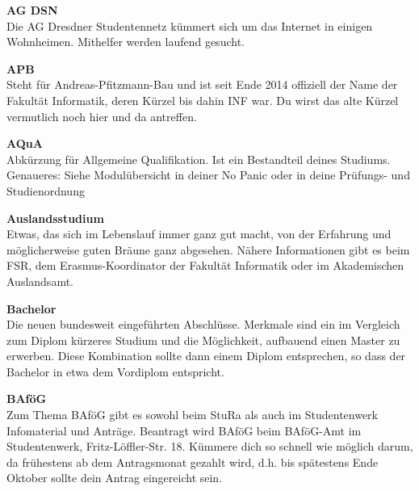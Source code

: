
\begin{multicols}{2}

\textbf{AG DSN} \\
Die AG Dresdner Studentennetz kümmert sich um das Internet in einigen Wohnheimen.
Mithelfer werden laufend gesucht. 


\textbf{APB} \\
Steht für Andreas-Pfitzmann-Bau und ist seit Ende 2014 offiziell der Name der Fakultät Informatik, deren Kürzel bis dahin INF war. Du wirst das alte Kürzel vermutlich noch hier und da antreffen.

\textbf{AQuA} \\
Abkürzung für Allgemeine Qualifikation.
Ist ein Bestandteil deines Studiums.
Genaueres:
Siehe Modulübersicht in deiner No Panic oder in deine Prüfungs- und Studienordnung  %


\textbf{Auslandsstudium} \\
Etwas, das sich im Lebenslauf immer ganz gut macht, von der Erfahrung und möglicherweise guten Bräune ganz abgesehen.
Nähere Informationen gibt es beim FSR, dem Erasmus-Koordinator der Fakultät Informatik oder im Akademischen Auslandsamt. 

\textbf{Bachelor} \\
Die neuen bundesweit eingeführten Abschlüsse. %
Merkmale sind ein im Vergleich zum Diplom kürzeres Studium und die Möglichkeit, aufbauend einen Master zu erwerben. Diese Kombination sollte dann einem Diplom entsprechen, so dass der Bachelor in etwa dem Vordiplom entspricht.

\vfill\columnbreak

\textbf{BAföG} \\
Zum Thema BAföG gibt es sowohl beim StuRa als auch im Studentenwerk Infomaterial und Anträge.
Beantragt wird BAföG beim BAföG-Amt im Studentenwerk, Fritz-Löffler-Str. 18.
Kümmere dich so schnell wie möglich darum, da frühestens ab dem Antragsmonat gezahlt wird, d.h. bis spätestens Ende Oktober sollte dein Antrag eingereicht sein. 


\end{multicols}
